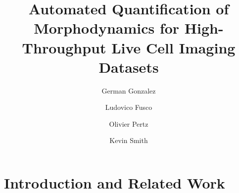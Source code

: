 \documentclass{llncs}
\begin{document}
%
\frontmatter          %
%
\pagestyle{empty}  %
%
\mainmatter              %
%
\title{Automated Quantification of Morphodynamics
for High-Throughput Live Cell Imaging Datasets}

%
\author{German Gonzalez \and Ludovico Fusco \and Olivier Pertz \and Kevin Smith}



\authorrunning{-}   %
%
\tocauthor{-}

\newcommand{\comment}[1]{}
\maketitle              %

\begin{abstract}

\end{abstract}

\section{Introduction and Related Work}
\label{sec:intro}


%
\end{document}
